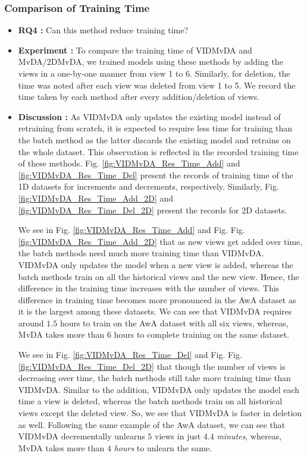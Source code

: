 \subsubsection{Comparison of Training Time}
\label{ssubs:VIDMvDA_Time}
\begin{itemize}
\item \textbf{RQ4 :}
Can this method reduce training time?

\item \textbf{Experiment :}
To compare the training time of VIDMvDA and MvDA/2DMvDA, we trained models using these methods by adding the views in a one-by-one manner from view 1 to 6. Similarly, for deletion, the time was noted after each view was deleted from view 1 to 5. We record the time taken by each method after every addition/deletion of views.

\item \textbf{Discussion :}
As VIDMvDA only updates the existing model instead of retraining from scratch, it is expected to require less time for training than the batch method as the latter discards the existing model and retrains on the whole dataset. This observation is reflected in the recorded training time of these methods. Fig. \ref{fig:VIDMvDA_Res_Time_Add} and \ref{fig:VIDMvDA_Res_Time_Del} present the records of training time of the 1D datasets for increments and decrements, respectively. Similarly, Fig. \ref{fig:VIDMvDA_Res_Time_Add_2D} and \ref{fig:VIDMvDA_Res_Time_Del_2D} present the records for 2D datasets.

We see in Fig. \ref{fig:VIDMvDA_Res_Time_Add} and Fig. Fig. \ref{fig:VIDMvDA_Res_Time_Add_2D} that as new views get added over time, the batch methods need much more training time than VIDMvDA. VIDMvDA only updates the model when a new view is added, whereas the batch methods train on all the historical views and the new view. Hence, the difference in the training time increases with the number of views. This difference in training time becomes more pronounced in the AwA dataset as it is the largest among these datasets. We can see that VIDMvDA requires around $1.5$ hours to train on the AwA dataset with all six views, whereas, MvDA takes more than $6$ hours to complete training on the same dataset.

We see in Fig. \ref{fig:VIDMvDA_Res_Time_Del} and Fig. Fig. \ref{fig:VIDMvDA_Res_Time_Del_2D} that though the number of views is decreasing over time, the batch methods still take more training time than VIDMvDA. Similar to the addition, VIDMvDA only updates the model each time a view is deleted, whereas the batch methods train on all historical views except the deleted view. So, we see that VIDMvDA is faster in deletion as well. Following the same example of the AwA dataset, we can see that VIDMvDA decrementally unlearns $5$ views in just $4.4$ \emph{minutes}, whereas, MvDA takes more than $4$ \emph{hours} to unlearn the same.



\end{itemize}
